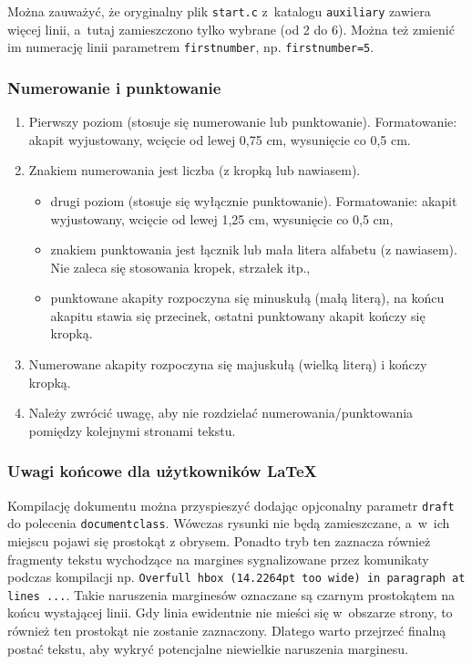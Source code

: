 \documentclass[12pt,twoside]{article}
\begin{document}
Można zauważyć, że oryginalny plik \texttt{start.c} z~katalogu \texttt{auxiliary} zawiera więcej linii, a~tutaj zamieszczono tylko wybrane (od 2 do 6). 
Można też zmienić im numerację linii parametrem \verb|firstnumber|, np. \verb|firstnumber=5|.

\subsubsection{Numerowanie i punktowanie}

\begin{enumerate}[label=\arabic*), leftmargin=1.25cm]
	\item Pierwszy poziom (stosuje się numerowanie lub punktowanie). Formatowanie:
	akapit wyjustowany, wcięcie od lewej 0,75 cm, wysunięcie co 0,5 cm.
	\item Znakiem numerowania jest liczba (z kropką lub nawiasem).
		\begin{itemize}[label={--},labelsep=0.4cm,leftmargin=0.6cm]
			\item drugi poziom (stosuje się wyłącznie punktowanie). Formatowanie: akapit
			wyjustowany, wcięcie od lewej 1,25 cm, wysunięcie co 0,5 cm,
			\item znakiem punktowania jest łącznik lub mała litera alfabetu (z nawiasem). Nie
			zaleca się stosowania kropek, strzałek itp.,
			\item punktowane akapity rozpoczyna się minuskułą (małą literą), na końcu akapitu
			stawia się przecinek, ostatni punktowany akapit kończy się kropką.
		\end{itemize}
	\item Numerowane akapity rozpoczyna się majuskułą (wielką literą) i kończy kropką.
	\item Należy zwrócić uwagę, aby nie rozdzielać numerowania/punktowania pomiędzy
	kolejnymi stronami tekstu.
\end{enumerate}

\subsubsection{Uwagi końcowe dla użytkowników \LaTeX}
Kompilację dokumentu można przyspieszyć dodając opjconalny parametr \texttt{draft} do polecenia \texttt{documentclass}. 
Wówczas rysunki nie będą zamieszczane, a~w~ich miejscu pojawi się prostokąt z obrysem.
Ponadto tryb ten zaznacza również fragmenty tekstu wychodzące na margines sygnalizowane przez komunikaty podczas kompilacji np. \texttt{Overfull hbox (14.2264pt too wide) in paragraph at lines ...}.
Takie naruszenia marginesów oznaczane są czarnym prostokątem na końcu wystającej linii. 
Gdy linia ewidentnie nie mieści się w~obszarze strony, to również ten prostokąt nie zostanie zaznaczony. 
Dlatego warto przejrzeć finalną postać tekstu, aby wykryć potencjalne niewielkie naruszenia marginesu.
\end{document}
